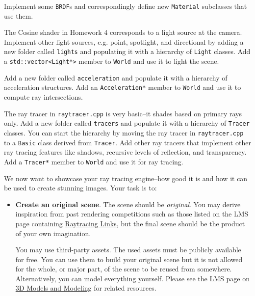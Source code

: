 \documentclass[addpoints]{exam}
\begin{document}
\begin{questions}
  
  Implement some \texttt{BRDF}s and correspondingly define new \texttt{Material} subclasses that use them.

  The Cosine shader in Homework 4 corresponds to a light source at the camera. Implement other light sources, e.g. point, spotlight, and directional by adding a new folder called \texttt{lights} and populating it with a hierarchy of \texttt{Light} classes. Add a \texttt{std::vector<Light*>} member to \texttt{World} and use it to light the scene.

  Add a new folder called \texttt{acceleration} and populate it with a hierarchy of acceleration structures. Add an \texttt{Acceleration*} member to \texttt{World} and use it to compute ray intersections.

  The ray tracer in \texttt{raytracer.cpp} is very basic--it shades based on primary rays only. Add a new folder called \texttt{tracers} and populate it with a hierarchy of \texttt{Tracer} classes. You can start the hierarchy by moving the ray tracer in \texttt{raytracer.cpp} to a \texttt{Basic} class derived from \texttt{Tracer}. Add other ray tracers that implement other ray tracing features like shadows, recursive levels of reflection, and transparency. Add a \texttt{Tracer*} member to \texttt{World} and use it for ray tracing.

  \newpage
  We now want to showcase your ray tracing engine--how good it is and how it can be used to create stunning images. Your task is to:
  \begin{itemize}
  \item \textbf{Create an original scene}. The scene should be \emph{original}. You may derive inspiration from past rendering competitions such as those listed on the LMS page containing \href{https://hulms.instructure.com/courses/332/pages/raytracing-links?module_item_id=18597}{Raytracing Links}, but the final scene should be the product of your own imagination.
    
    You may use third-party assets. The used assets must be publicly available for free. You can use them to build your original scene but it is not allowed for the whole, or major part, of the scene to be reused from somewhere. Alternatively, you can model everything yourself. Please see the LMS page on \href{https://hulms.instructure.com/courses/332/pages/3d-models-and-modeling?module_item_id=18598}{3D Models and Modeling} for related resources.


\end{itemize}
\end{questions}
\end{document}
